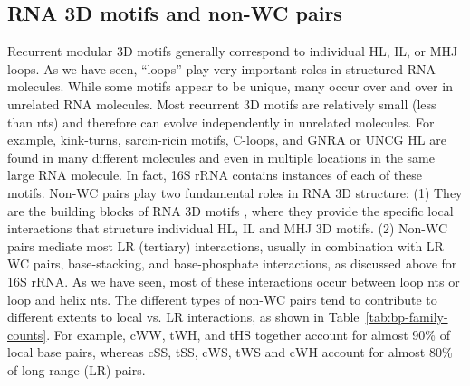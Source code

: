 \subsection{RNA 3D motifs and non-WC pairs}

Recurrent modular 3D motifs generally correspond to individual HL, IL, or MHJ
loops. As we have seen, ``loops'' play very important roles in structured RNA
molecules. While some motifs appear to be unique, many occur over and over in
unrelated RNA molecules. Most recurrent 3D motifs are relatively small (less
than  nts) and therefore can evolve independently in unrelated
molecules. For example, kink-turns, sarcin-ricin motifs, C-loops, and GNRA or
UNCG HL are found in many different molecules and even in multiple locations in
the same large RNA molecule. In fact, 16S rRNA contains instances of each of
these motifs. Non-WC pairs play two fundamental roles in RNA 3D structure: (1)
They are the building blocks of RNA 3D motifs \cite{Leontis2006}, where they
provide the specific local interactions that structure individual HL, IL and MHJ
3D motifs. (2) Non-WC pairs mediate most LR (tertiary) interactions, usually in
combination with LR WC pairs, base-stacking, and base-phosphate interactions, as
discussed above for 16S rRNA. As we have seen, most of these interactions occur
between loop nts or loop and helix nts. The different types of non-WC pairs tend
to contribute to different extents to local vs. LR interactions, as shown in
Table~\ref{tab:bp-family-counts}. For example, cWW, tWH, and tHS together
account for almost 90\% of local base pairs, whereas cSS, tSS, cWS, tWS and cWH
account for almost 80\% of long-range (LR) pairs. 

